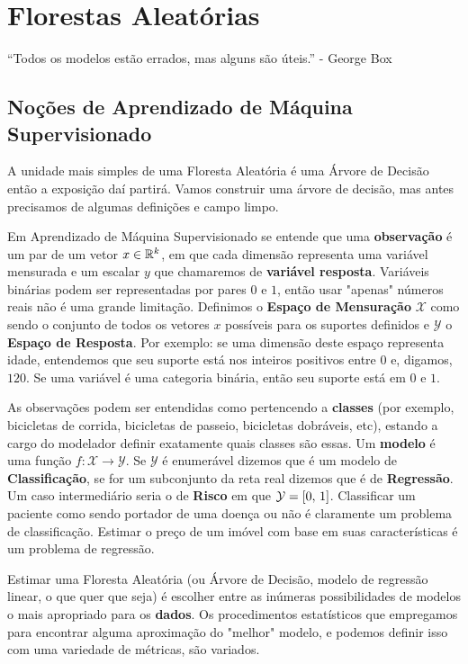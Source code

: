 
\chapter{Florestas Aleatórias}

\begin{citacao}
	``Todos os modelos estão errados, mas alguns são úteis.''  - George Box
\end{citacao}

\section{Noções de Aprendizado de Máquina Supervisionado}

A unidade mais simples de uma Floresta Aleatória é uma Árvore de Decisão \cite{breiman2017classification} então a exposição daí partirá. Vamos construir uma árvore de decisão, mas antes precisamos de algumas definições e campo limpo. 

Em Aprendizado de Máquina Supervisionado se entende que uma \textbf{observação} é um par de um vetor $x \in \mathbb{R}^k$, em que cada dimensão representa uma variável mensurada e um escalar $y$ que chamaremos de \textbf{variável resposta}. Variáveis binárias podem ser representadas por pares $0$ e $1$, então usar "apenas" números reais não é uma grande limitação. Definimos o \textbf{Espaço de Mensuração} $\mathcal{X}$ como sendo o conjunto de todos os vetores $x$ possíveis para os suportes definidos e $\mathcal{Y}$ o \textbf{Espaço de Resposta}. Por exemplo: se uma dimensão deste espaço representa idade, entendemos que seu suporte está nos inteiros positivos entre $0$ e, digamos, $120$. Se uma variável é uma categoria binária, então seu suporte está em $0$ e $1$. 

As observações podem ser entendidas como pertencendo a \textbf{classes} (por exemplo, bicicletas de corrida, bicicletas de passeio, bicicletas dobráveis, etc), estando a cargo do modelador definir exatamente quais classes são essas. Um \textbf{modelo} é uma função $f: \mathcal{X} \to \mathcal{Y}$. Se $\mathcal{Y}$ é enumerável dizemos que é um modelo de \textbf{Classificação}, se for um subconjunto da reta real dizemos que é de \textbf{Regressão}. Um caso intermediário seria o de \textbf{Risco} em que $\mathcal{Y} = [0, \,1]$. Classificar um paciente como sendo portador de uma doença ou não é claramente um problema de classificação. Estimar o preço de um imóvel com base em suas características é um problema de regressão. 

Estimar uma Floresta Aleatória (ou Árvore de Decisão, modelo de regressão linear, o que quer que seja) é  escolher entre as inúmeras possibilidades de modelos o mais apropriado para os \textbf{dados}. Os procedimentos estatísticos que empregamos para encontrar alguma aproximação do "melhor" modelo, e podemos definir isso com uma variedade de métricas, são variados.

